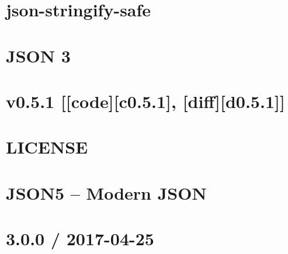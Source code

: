 \documentclass[twoside]{book}
\newcommand{\+}{\discretionary{\mbox{\scriptsize$\hookleftarrow$}}{}{}}
\begin{document}
\chapter{json-\/stringify-\/safe}
\label{md__c_1_workspace_demo_src_main_script_node_modules_json-stringify-safe__r_e_a_d_m_e}

\chapter{J\+S\+ON 3}
\label{md__c_1_workspace_demo_src_main_script_node_modules_json3__r_e_a_d_m_e}

\chapter{v0.5.1 \mbox{[}\mbox{[}code\mbox{]}\mbox{[}c0.5.1\mbox{]}, \mbox{[}diff\mbox{]}\mbox{[}d0.5.1\mbox{]}\mbox{]}}
\label{md__c_1_workspace_demo_src_main_script_node_modules_json5__c_h_a_n_g_e_l_o_g}

\chapter{L\+I\+C\+E\+N\+SE}
\label{md__c_1_workspace_demo_src_main_script_node_modules_json5__l_i_c_e_n_s_e}

\chapter{J\+S\+O\+N5 – Modern J\+S\+ON}
\label{md__c_1_workspace_demo_src_main_script_node_modules_json5__r_e_a_d_m_e}

\chapter{3.0.0 / 2017-\/04-\/25}
\label{md__c_1_workspace_demo_src_main_script_node_modules_jsonfile__c_h_a_n_g_e_l_o_g}

\end{document}
